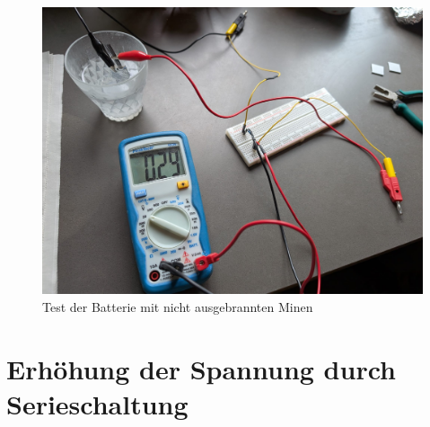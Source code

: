 \documentclass[ngerman, a4paper,12pt]{article}
\begin{document}
\vspace{12px}

\begin{figure}[htbp]
	\centering
	\includegraphics[height=0.3\textheight]{Bild13.jpg}
	\caption{Test der Batterie mit nicht ausgebrannten Minen}\label{fig:bild13}
\end{figure}
\newpage

\section{Erhöhung der Spannung durch Serieschaltung}
\end{document}
